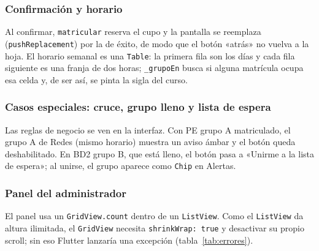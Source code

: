 


\subsubsection{Confirmación y horario}
Al confirmar, \texttt{matricular} reserva el cupo y la pantalla se reemplaza (\texttt{pushReplacement}) por la de éxito, de modo que el botón «atrás» no vuelva a la hoja. El horario semanal es una \texttt{Table}: la primera fila son los días y cada fila siguiente es una franja de dos horas; \texttt{\_grupoEn} busca si alguna matrícula ocupa esa celda y, de ser así, se pinta la sigla del curso.



\subsubsection{Casos especiales: cruce, grupo lleno y lista de espera}
Las reglas de negocio se ven en la interfaz. Con PE grupo A matriculado, el grupo A de Redes (mismo horario) muestra un aviso ámbar y el botón queda deshabilitado. En BD2 grupo B, que está lleno, el botón pasa a «Unirme a la lista de espera»; al unirse, el grupo aparece como \texttt{Chip} en Alertas.


\subsubsection{Panel del administrador}
El panel usa un \texttt{GridView.count} dentro de un \texttt{ListView}. Como el \texttt{ListView} da altura ilimitada, el \texttt{GridView} necesita \texttt{shrinkWrap: true} y desactivar su propio scroll; sin eso Flutter lanzaría una excepción (tabla~\ref{tab:errores}).

